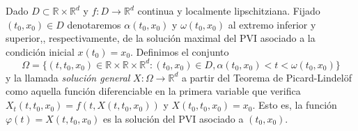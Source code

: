 \documentclass{article}
\begin{document}
Dado $D \subset \mathbb{R} \times \mathbb{R}^d$ y $f : D \to \mathbb{R}^d$ continua y localmente lipschitziana. Fijado $(t_0, x_0) \in D$ denotaremos $\alpha(t_0, x_0)$ y $\omega(t_0, x_0)$ al extremo inferior y superior,, respectivamente, de la solución maximal del PVI asociado a la condición inicial $x(t_0) = x_0$. Definimos el conjunto
\[\Omega = \{(t, t_0, x_0) \in \mathbb{R}\times\mathbb{R}\times\mathbb{R}^d : (t_0, x_0) \in D, \alpha(t_0, x_0) < t < \omega(t_0, x_0)\}\]
y la llamada \emph{solución general} $X: \Omega \to \mathbb{R}^d$ a partir del Teorema de Picard-Lindelöf como aquella función diferenciable en la primera variable que verifica $X_t(t, t_0, x_0) = f(t, X(t, t_0, x_0))$ y $X(t_0, t_0, x_0) = x_0$. Esto es, la función $\varphi(t) = X(t, t_0, x_0)$ es la solución del PVI asociado a $(t_0, x_0)$.
\end{document}
